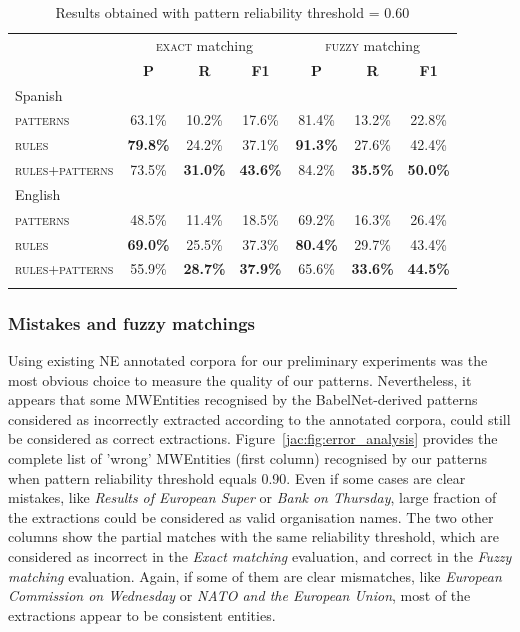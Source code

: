 \documentclass[output=paper]{langsci/langscibook}
\begin{document}
\begin{table}[h]
\begin{tabular}{l ccc ccc}\lsptoprule
&     \multicolumn{3}{c}{\textsc{exact} matching}  & \multicolumn{3}{c}{\textsc{fuzzy} matching}  \\\cmidrule(lr){2-4}\cmidrule(lr){5-7}
&  \textbf{P}  & \textbf{R}  &  \textbf{F1}  &  \textbf{P}  & \textbf{R}  &  \textbf{F1} \\ 
\midrule
\textnormal{Spanish}                        & & &  & & &   \\
\textsc{patterns}                &     63.1\% & 10.2\% & 17.6\% & 81.4\% & 13.2\% & 22.8\%  \\  
\textsc{rules}   &  \textbf{79.8\%} & 24.2\% & 37.1\% & \textbf{91.3\%} & 27.6\% & 42.4\%  \\
\textsc{rules+patterns}  &     73.5\% & \textbf{31.0\%} & \textbf{43.6\%} & 84.2\% & \textbf{35.5\%} & \textbf{50.0\%}  \\ 
\midrule
\textnormal{English}                        & & & &  & &   \\
\textsc{patterns}                &     48.5\% & 11.4\% & 18.5\% & 69.2\% & 16.3\% & 26.4\%   \\  
\textsc{rules}   &  \textbf{69.0\%} & 25.5\% & 37.3\% & \textbf{80.4\%} & 29.7\% & 43.4\%  \\
\textsc{rules+patterns}  &     55.9\% & \textbf{28.7\%} & \textbf{37.9\%} & 65.6\% & \textbf{33.6\%} & \textbf{44.5\%}  \\ 
\lspbottomrule
\end{tabular}
\caption{Results obtained with pattern reliability threshold = 0.60}
\label{jac:tab:EvalPatterns}
\end{table}


\subsubsection{Mistakes and fuzzy matchings}
Using existing NE annotated corpora for our preliminary experiments was the most obvious choice to measure the quality of our patterns. Nevertheless, it appears that some MWEntities recognised by the BabelNet-derived patterns considered as incorrectly extracted according to the annotated corpora, could still be considered as correct extractions.
Figure~\ref{jac:fig:error_analysis} provides the complete list of 'wrong' MWEntities (first column) recognised by our patterns when pattern reliability threshold equals 0.90. Even if some cases are clear mistakes, like \textit{Results of European Super} or \textit{Bank on Thursday}, large fraction of the extractions could be considered as valid organisation names. The two other columns show the partial matches with the same reliability threshold, which are considered as incorrect in the \emph{Exact matching} evaluation, and correct in the \emph{Fuzzy matching} evaluation. Again, if some of them are clear mismatches, like \textit{European Commission on Wednesday} or \textit{NATO and the European Union}, most of the extractions appear to be consistent entities.
\end{document}
